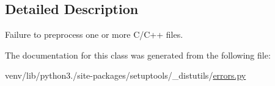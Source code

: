 \subsection{Detailed Description}
\begin{DoxyVerb}Failure to preprocess one or more C/C++ files.\end{DoxyVerb}
 

The documentation for this class was generated from the following file\+:\begin{DoxyCompactItemize}
\item 
venv/lib/python3./site-\/packages/setuptools/\+\_\+distutils/\hyperlink{__distutils_2errors_8py}{errors.\+py}\end{DoxyCompactItemize}
